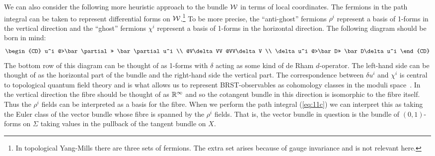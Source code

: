 We can also consider the following more heuristic approach to the
bundle $\cal{W}$ in terms of local coordinates.
The fermions in the path integral can be taken to
represent differential forms on $\cal{W}$.\footnote{In topological
Yang-Mills there are three sets of fermions. The extra set arises
because of gauge invariance and is not relevant here.} To be more precise, the
``anti-ghost'' fermions $\rho^i$ represent a basis of 1-forms in the vertical
direction and the ``ghost'' fermions $\chi^i$ represent a basis of
1-forms in the horizontal direction. The following diagram should be
born in mind:
\begin{equation} \label{eq:cd}
  \begin{CD}
    u^i @>\bar\partial>> \bar\partial u^i  \\
     @V\delta VV           @VV\delta V  \\
    \delta u^i @>\bar D>> \bar D\delta u^i
  \end{CD}
\end{equation}
The bottom row of this diagram can be thought of as 1-forms with
$\delta$ acting as some kind of de Rham $d$-operator. The
left-hand side can be thought of as the horizontal part of the bundle
and the right-hand side the vertical part. The correspondence between
$\delta u^i$ and $\chi^i$ is central to topological quantum field
theory and is what allows us to represent BRST-observables as
cohomology classes in the moduli space~\cite{W:tqft}. In the vertical
direction the fibre should be thought of as $\Bbb{R}^\infty$ and so the
cotangent bundle in this direction is isomorphic to the fibre itself.
Thus the $\rho^i$ fields can be interpreted as a basis for the fibre.
When we perform the path integral (\ref{eq:11c}) we can interpret this
as taking the Euler class of the vector bundle whose fibre is spanned
by the $\rho^i$ fields. That is, the vector bundle in question is the
bundle of $(0,1)$-forms on $\Sigma$ taking values in the pullback of
the tangent bundle on $X$.

